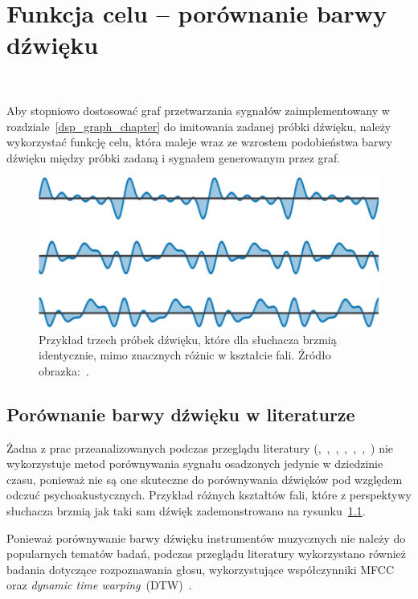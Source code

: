 \chapter{Funkcja celu -- porównanie barwy dźwięku}~\label{target_function_chapter}

Aby stopniowo dostosować graf przetwarzania sygnałów zaimplementowany 
w rozdziale~\ref{dsp_graph_chapter} do imitowania zadanej próbki dźwięku,
należy wykorzystać funkcję celu, która maleje wraz ze wzrostem podobieństwa
barwy dźwięku między próbki zadaną i sygnałem generowanym przez graf. 

\begin{figure}[H]\label{fig:waveform_not_equal_to_perception}
    \centering
    \includegraphics[width=0.45\linewidth]{rys03/d_dsp_example_graph.png}
    \caption{
      Przykład trzech próbek dźwięku, które dla słuchacza brzmią identycznie, mimo
      znacznych różnic w kształcie fali. Źródło obrazka:~\cite{engel2020ddsp}.
    }
\end{figure}

\section{Porównanie barwy dźwięku w literaturze}\label{sec:timbre_comparison_literature_overview}

Żadna z prac przeanalizowanych podczas przeglądu literatury
(\cite{engel2020ddsp},~\cite{ieee_synth_programming},~\cite{ddx7},~\cite{riffusion},~\cite{evolutionary_puredata},~\cite{parallel_evolutionary_optimization_synth_parameters},~\cite{mfcc_dtw})
nie wykorzystuje metod porównywania sygnału osadzonych jedynie w dziedzinie czasu, ponieważ
nie są one skuteczne do porównywania dźwięków pod względem odczuć psychoakustycznych.
Przykład różnych kształtów fali, które z perspektywy słuchacza brzmią jak
taki sam dźwięk zademonstrowano na rysunku~\ref{fig:waveform_not_equal_to_perception}.

Ponieważ porównywanie barwy dźwięku instrumentów muzycznych nie należy do popularnych
tematów badań, podczas przeglądu literatury wykorzystano również badania dotyczące
rozpoznawania głosu, wykorzystujące współczynniki MFCC oraz
\textit{dynamic time warping}~(DTW)~\cite{mfcc_dtw}.

